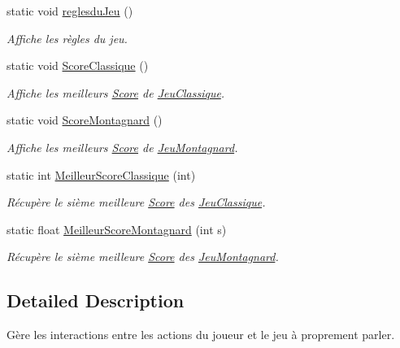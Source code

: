 \begin{DoxyCompactItemize}
\mbox{\label{classIHM_a41f84c5e14ce96d0dc25a42fe214bf3f}} 
static void \hyperlink{classIHM_a41f84c5e14ce96d0dc25a42fe214bf3f}{reglesdu\+Jeu} ()
\begin{DoxyCompactList}\small\item\em Affiche les règles du jeu. \end{DoxyCompactList}\item 
\mbox{\label{classIHM_ac2e668b4fa5ff1491bc15ae0a2d59d1d}} 
static void \hyperlink{classIHM_ac2e668b4fa5ff1491bc15ae0a2d59d1d}{Score\+Classique} ()
\begin{DoxyCompactList}\small\item\em Affiche les meilleurs \hyperlink{classScore}{Score} de \hyperlink{classJeuClassique}{Jeu\+Classique}. \end{DoxyCompactList}\item 
\mbox{\label{classIHM_a8f4dce1d816518f673fcafca08fd0ce5}} 
static void \hyperlink{classIHM_a8f4dce1d816518f673fcafca08fd0ce5}{Score\+Montagnard} ()
\begin{DoxyCompactList}\small\item\em Affiche les meilleurs \hyperlink{classScore}{Score} de \hyperlink{classJeuMontagnard}{Jeu\+Montagnard}. \end{DoxyCompactList}\item 
static int \hyperlink{classIHM_a4218e5b720799dd8bada264c7bc0d690}{Meilleur\+Score\+Classique} (int)
\begin{DoxyCompactList}\small\item\em Récupère le sième meilleure \hyperlink{classScore}{Score} des \hyperlink{classJeuClassique}{Jeu\+Classique}. \end{DoxyCompactList}\item 
static float \hyperlink{classIHM_a068cc2350e9f4fc005ad4378f02d62fa}{Meilleur\+Score\+Montagnard} (int s)
\begin{DoxyCompactList}\small\item\em Récupère le sième meilleure \hyperlink{classScore}{Score} des \hyperlink{classJeuMontagnard}{Jeu\+Montagnard}. \end{DoxyCompactList}\end{DoxyCompactItemize}


\subsection{Detailed Description}
Gère les interactions entre les actions du joueur et le jeu à proprement parler. 

